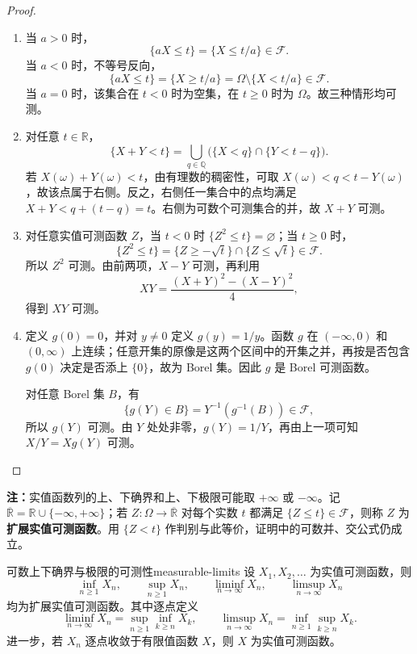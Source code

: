 \begin{proof}
\begin{enumerate}
\item 当 $a>0$ 时，
\[
\{aX\leq t\}=\{X\leq t/a\}\in\mathcal F.
\]
当 $a<0$ 时，不等号反向，
\[
\{aX\leq t\}=\{X\geq t/a\}=\Omega\setminus\{X<t/a\}\in\mathcal F.
\]
当 $a=0$ 时，该集合在 $t<0$ 时为空集，在 $t\geq0$ 时为 $\Omega$。故三种情形均可测。
\item 对任意 $t\in\mathbb R$，
\[
\{X+Y<t\}
=\bigcup_{q\in\mathbb Q}\bigl(\{X<q\}\cap\{Y<t-q\}\bigr).
\]
若 $X(\omega)+Y(\omega)<t$，由有理数的稠密性，可取 $X(\omega)<q<t-Y(\omega)$，故该点属于右侧。反之，右侧任一集合中的点均满足 $X+Y<q+(t-q)=t$。右侧为可数个可测集合的并，故 $X+Y$ 可测。
\item 对任意实值可测函数 $Z$，当 $t<0$ 时 $\{Z^2\leq t\}=\varnothing$；当 $t\geq0$ 时，
\[
\{Z^2\leq t\}=\{Z\geq-\sqrt t\}\cap\{Z\leq\sqrt t\}\in\mathcal F.
\]
所以 $Z^2$ 可测。由前两项，$X-Y$ 可测，再利用
\[
XY=\frac{(X+Y)^2-(X-Y)^2}{4},
\]
得到 $XY$ 可测。
\item 定义 $g(0)=0$，并对 $y\ne0$ 定义 $g(y)=1/y$。函数 $g$ 在 $(-\infty,0)$ 和 $(0,\infty)$ 上连续；任意开集的原像是这两个区间中的开集之并，再按是否包含 $g(0)$ 决定是否添上 $\{0\}$，故为 Borel 集。因此 $g$ 是 Borel 可测函数。

对任意 Borel 集 $B$，有
\[
\{g(Y)\in B\}=Y^{-1}(g^{-1}(B))\in\mathcal F,
\]
所以 $g(Y)$ 可测。由 $Y$ 处处非零，$g(Y)=1/Y$，再由上一项可知 $X/Y=Xg(Y)$ 可测。
\end{enumerate}
\end{proof}

\textbf{注：}\quad 实值函数列的上、下确界和上、下极限可能取 $+\infty$ 或 $-\infty$。记 $\overline{\mathbb R}=\mathbb R\cup\{-\infty,+\infty\}$；若 $Z:\Omega\to\overline{\mathbb R}$ 对每个实数 $t$ 都满足 $\{Z\leq t\}\in\mathcal F$，则称 $Z$ 为\textbf{扩展实值可测函数}。用 $\{Z<t\}$ 作判别与此等价，证明中的可数并、交公式仍成立。

\begin{proposition}{可数上下确界与极限的可测性}{measurable-limits}
设 $X_1,X_2,\ldots$ 为实值可测函数，则
\[
\inf_{n\geq1}X_n,\qquad \sup_{n\geq1}X_n,\qquad
\liminf_{n\to\infty}X_n,\qquad \limsup_{n\to\infty}X_n
\]
均为扩展实值可测函数。其中逐点定义
\[
\liminf_{n\to\infty}X_n=\sup_{n\geq1}\inf_{k\geq n}X_k,\qquad
\limsup_{n\to\infty}X_n=\inf_{n\geq1}\sup_{k\geq n}X_k.
\]
进一步，若 $X_n$ 逐点收敛于有限值函数 $X$，则 $X$ 为实值可测函数。
\end{proposition}

